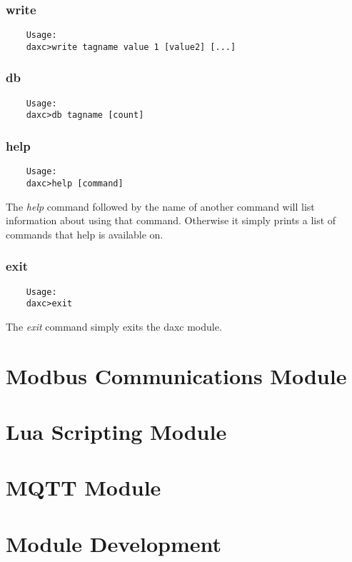 	\subsection{write}
	\begin{verbatim}
	Usage:
	daxc>write tagname value 1 [value2] [...]
	\end{verbatim}
	
	\subsection{db}
	\begin{verbatim}
	Usage:
	daxc>db tagname [count]
	\end{verbatim}
	
	\subsection{help}
	\begin{verbatim}
	Usage:
	daxc>help [command]
	\end{verbatim}
	
	The \textit{help} command followed by the name of another command will list
	information about using that command. Otherwise it simply prints a list of
	commands that help is available on.
	
	\subsection{exit}
	\begin{verbatim}
	Usage:
	daxc>exit
	\end{verbatim}
	The \textit{exit} command simply exits the daxc module.
	
	\chapter{Modbus Communications Module}
	
	\chapter{Lua Scripting Module}
	
	\chapter{MQTT Module}
	
	
	\chapter{Module Development}
	



